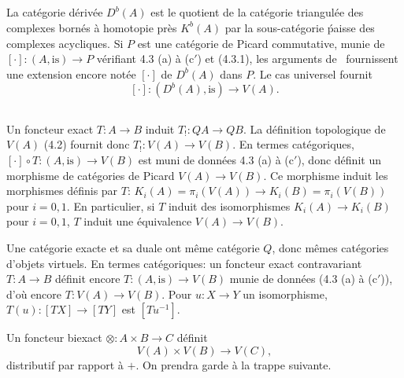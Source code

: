 \documentclass[12pt,a4paper]{article}
\theoremstyle{plain}
\theoremstyle{definition}
\begin{document}
\subsection{}

La cat\'egorie d\'eriv\'ee $D^b(A)$ est le quotient de la cat\'egorie triangul\'ee
des complexes born\'es \`a homotopie pr\`es $K^b(A)$ par la sous-cat\'egorie \'paisse des
complexes acycliques. Si $P$ est une cat\'egorie de Picard commutative, munie de
$[\cdot]: (A, \text{is}) \to P$ v\'erifiant 4.3 (a) \`a (c$'$) et (4.3.1), les arguments de~\cite{10}
fournissent une extension encore not\'ee $[\cdot]$ de $D^b(A)$ dans $P$. Le cas universel
fournit
\[
[\cdot]: (D^b(A), \text{is}) \longrightarrow V(A) .
\]

\subsection{}

Un foncteur exact $T: A \to B$ induit $T_!: QA \to QB$. La d\'efinition topologique
de $V(A)$ (4.2) fournit donc $T_!: V(A) \to V(B)$. En termes cat\'egoriques, $[\cdot] \circ
T: (A, \text{is}) \to V(B)$ est muni de donn\'ees 4.3 (a) \`a (c$'$), donc d\'efinit un morphisme
de cat\'egories de Picard $V(A) \to V(B)$. Ce morphisme induit les morphismes d\'efinis
par $T$: $K_i(A) = \pi_i(V(A)) \to K_i(B) = \pi_i(V(B))$ pour $i = 0, 1$. En particulier,
si $T$ induit des isomorphismes $K_i(A) \to K_i(B)$ pour $i = 0, 1$, $T$ induit une
\'equivalence $V(A) \to V(B)$.

Une cat\'egorie exacte et sa duale ont m\^eme cat\'egorie $Q$, donc m\^emes cat\'egories
d'objets virtuels. En termes cat\'egoriques: un foncteur exact contravariant
$T: A \to B$ d\'efinit encore $T: (A, \text{is}) \to V(B)$ munie de donn\'ees (4.3 (a) \`a (c$'$)), d'o\`u
encore $T: V(A) \to V(B)$. Pour $u: X \to Y$ un isomorphisme, $T(u): [TX] \to [TY]$
est $[Tu^{-1}]$.

Un foncteur biexact $\otimes: A \times B \to C$ d\'efinit
\[
V(A) \times V(B) \to V(C) ,
\]
distributif par rapport \`a $+$. On prendra garde \`a la trappe suivante.
\end{document}

